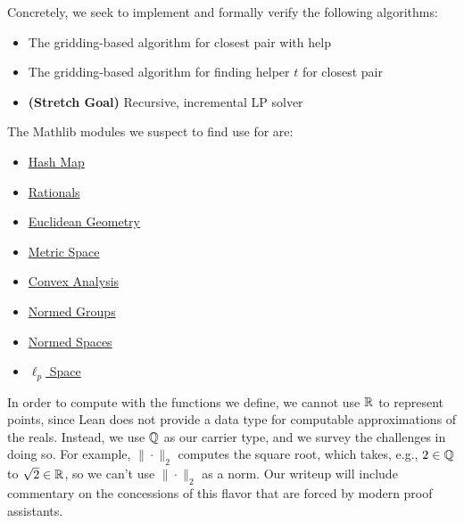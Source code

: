 \documentclass{article}
\begin{document}
Concretely, we seek to implement and formally verify the following algorithms:
\begin{itemize}
  \item The gridding-based algorithm for closest pair with help
  \item The gridding-based algorithm for finding helper $t$ for closest pair
  \item \textbf{(Stretch Goal)} Recursive, incremental LP solver
\end{itemize}
The Mathlib modules we suspect to find use for are:
\begin{itemize}
  \item \href{https://leanprover-community.github.io/mathlib_docs/data/hash_map.html}{Hash Map}
  \item \href{https://leanprover-community.github.io/mathlib_docs/data/rat/basic.html}{Rationals}
  \item \href{https://leanprover-community.github.io/mathlib_docs/geometry/euclidean/basic.html}{Euclidean Geometry}
  \item \href{https://leanprover-community.github.io/mathlib_docs/topology/metric_space/basic.html#metric.ball}{Metric Space}
  \item \href{https://leanprover-community.github.io/mathlib_docs/analysis/convex/basic.html#convex_hyperplane}{Convex Analysis}
  \item \href{https://leanprover-community.github.io/mathlib_docs/analysis/normed/group/basic.html}{Normed Groups}
  \item \href{https://leanprover-community.github.io/mathlib_docs/analysis/normed_space/basic.html}{Normed Spaces}
  \item \href{https://leanprover-community.github.io/mathlib_docs/analysis/normed_space/lp_space.html}{$\ell_p$ Space}
\end{itemize}
In order to compute with the functions we define, we cannot use $\mathbb{R}$ to represent points, since Lean does not provide a data type for computable approximations of the reals.
Instead, we use $\mathbb{Q}$ as our carrier type, and we survey the challenges in doing so.
For example, $\| \cdot \|_2$ computes the square root, which takes, e.g., $2 \in \mathbb{Q}$ to $\sqrt{2} \in \mathbb{R}$, so we can't use $\| \cdot \|_2$ as a norm.
Our writeup will include commentary on the concessions of this flavor that are forced by modern proof assistants.




\end{document}
